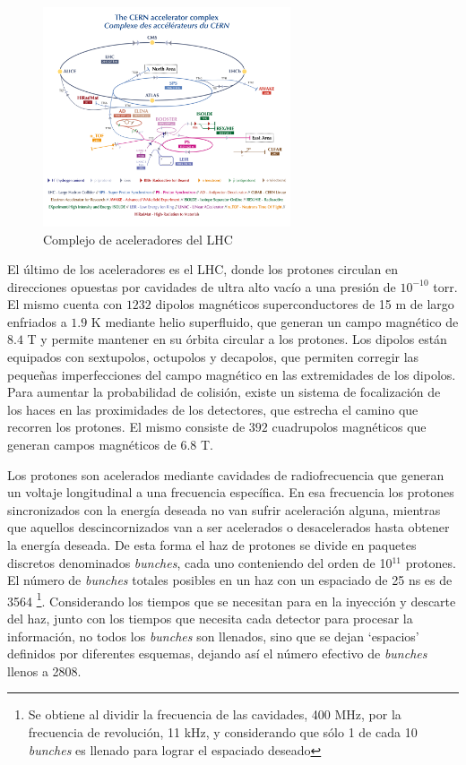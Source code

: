 \begin{figure}
  \centering
  \includegraphics[width=0.65\textwidth]{images/LHC_complex.png}
  \caption{Complejo de aceleradores del LHC}
  \label{LHC_complex}
\end{figure}

El último de los aceleradores es el LHC, donde los protones circulan en direcciones opuestas por cavidades de ultra alto vacío a una presión de $10^{-10}$ torr. El mismo cuenta con $1232$ dipolos magnéticos superconductores de 15 m de largo enfriados a $1.9$ K mediante helio superfluido, que generan un campo magnético de $8.4$ T y permite mantener en su órbita circular a los protones. Los dipolos están equipados con sextupolos, octupolos y decapolos, que permiten corregir las pequeñas imperfecciones del campo magnético en las extremidades de los dipolos. Para aumentar la probabilidad de colisión, existe un sistema de focalización de los haces en las proximidades de los detectores, que estrecha el camino que recorren los protones. El mismo consiste de $392$ cuadrupolos magnéticos que generan campos magnéticos de $6.8$ T. 

Los protones son acelerados mediante cavidades de radiofrecuencia que generan un voltaje longitudinal a una frecuencia específica. En esa frecuencia los protones sincronizados con la energía deseada no van sufrir aceleración alguna, mientras que aquellos descincornizados van a ser acelerados o desacelerados hasta obtener la energía deseada. De esta forma el haz de protones se divide en paquetes discretos denominados \textit{bunches}, cada uno conteniendo del orden de 10$^{11}$ protones. El número de \textit{bunches} totales posibles en un haz con un espaciado de 25 ns es de 3564 \footnote{Se obtiene al dividir la frecuencia de las cavidades, 400 MHz, por la frecuencia de revolución, 11 kHz, y considerando que sólo 1 de cada 10 \textit{bunches} es llenado para lograr el espaciado deseado}. Considerando los tiempos que se necesitan para en la inyección y descarte del haz, junto con los tiempos que necesita cada detector para procesar la información, no todos los \textit{bunches} son llenados, sino que se dejan `espacios' definidos por diferentes esquemas, dejando así el número efectivo de \textit{bunches} llenos a 2808.

